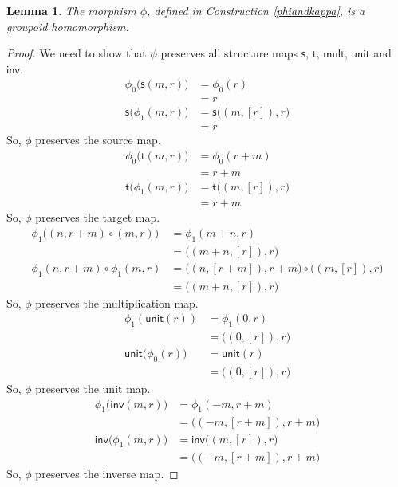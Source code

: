 \documentclass{article}
\theoremstyle{plain}
\newtheorem{lem}[thm]{Lemma}
\theoremstyle{definition}
\begin{document}
\begin{lem}
The morphism $\phi$, defined in Construction \ref{phiandkappa}, is a groupoid homomorphism.
\end{lem}
\begin{proof}
We need to show that $\phi$ preserves all structure maps $\mathsf{s}$, $\mathsf{t}$, $\mathsf{mult}$, $\mathsf{unit}$ and $\mathsf{inv}$.
\begin{align*}
\phi_0\big(\mathsf{s}(m,r)\big) & = \phi_0(r) \\
& = r \\
\mathsf{s}\big(\phi_1(m,r)\big) & = \mathsf{s}\bigl((m,[r]),r\bigr) \\
& = r
\end{align*}
So, $\phi$ preserves the source map.
\begin{align*}
\phi_0\big(\mathsf{t}(m,r)\big) & = \phi_0(r+m) \\
& = r+m \\
\mathsf{t}\big(\phi_1(m,r)\big) & = \mathsf{t}\bigl((m,[r]),r\bigr) \\
& = r+m
\end{align*}
So, $\phi$ preserves the target map.
\begin{align*}
\phi_1\bigl((n,r+m) \circ (m,r)\bigr) & = \phi_1(m+n,r) \\
& = \bigl((m+n,[r]),r\bigr) \\
\phi_1(n,r+m) \circ \phi_1(m,r) & = \bigl((n,[r+m]),r+m\bigr) \circ \bigl((m,[r]),r\bigr) \\
& = \bigl((m+n,[r]),r\bigr)
\end{align*}
So, $\phi$ preserves the multiplication map.
\begin{align*}
\phi_1(\mathsf{unit}(r)) & = \phi_1(0,r) \\
& = \bigl((0,[r]),r\bigr) \\
\mathsf{unit}\bigl(\phi_0(r)\bigr) & = \mathsf{unit}(r) \\
& = \bigl((0,[r]),r\bigr)
\end{align*}
So, $\phi$ preserves the unit map.
\begin{align*}
\phi_1\big(\mathsf{inv}(m,r)\big) & = \phi_1(-m,r+m) \\
& = \bigl((-m,[r+m]),r+m\bigr) \\
\mathsf{inv}\bigl(\phi_1(m,r)\bigr) & = \mathsf{inv}\bigl((m,[r]),r\bigr) \\
& = \bigl((-m,[r+m]),r+m\bigr)
\end{align*}
So, $\phi$ preserves the inverse map.
\end{proof}
\end{document}
